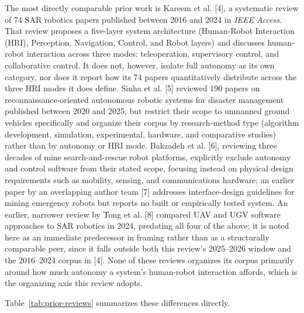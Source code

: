 \documentclass[journal]{IEEEtran}
\begin{document}
The most directly comparable prior work is Kareem et al. [4], a systematic review of 74 SAR robotics papers published between 2016 and 2024 in \textit{IEEE Access}. That review proposes a five-layer system architecture (Human-Robot Interaction (HRI), Perception, Navigation, Control, and Robot layers) and discusses human-robot interaction across three modes: teleoperation, supervisory control, and collaborative control. It does not, however, isolate full autonomy as its own category, nor does it report how its 74 papers quantitatively distribute across the three HRI modes it does define. Sinha et al. [5] reviewed 190 papers on reconnaissance-oriented autonomous robotic systems for disaster management published between 2020 and 2025, but restrict their scope to unmanned ground vehicles specifically and organize their corpus by research-method type (algorithm development, simulation, experimental, hardware, and comparative studies) rather than by autonomy or HRI mode. Bakzadeh et al. [6], reviewing three decades of mine search-and-rescue robot platforms, explicitly exclude autonomy and control software from their stated scope, focusing instead on physical design requirements such as mobility, sensing, and communications hardware; an earlier paper by an overlapping author team [7] addresses interface-design guidelines for mining emergency robots but reports no built or empirically tested system. An earlier, narrower review by Tong et al. [8] compared UAV and UGV software approaches to SAR robotics in 2024, predating all four of the above; it is noted here as an immediate predecessor in framing rather than as a structurally comparable peer, since it falls outside both this review's 2025--2026 window and the 2016--2024 corpus in [4]. None of these reviews organizes its corpus primarily around how much autonomy a system's human-robot interaction affords, which is the organizing axis this review adopts.

Table~\ref{tab:prior-reviews} summarizes these differences directly.
\end{document}
